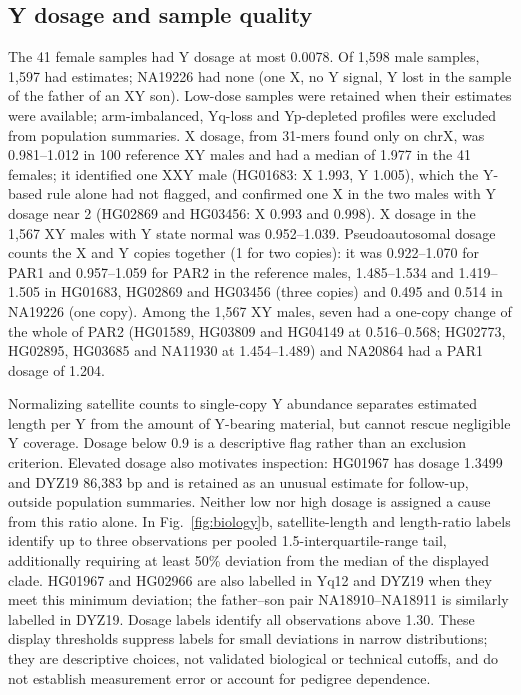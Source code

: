 \documentclass[pdflatex,sn-nature]{sn-jnl}
\begin{document}
\subsection{Y dosage and sample quality}\label{sec:res-dosage}
The 41 female samples had Y dosage at most 0.0078. Of 1,598 male samples, 1,597 had estimates; NA19226 had none (one X, no Y signal, Y lost in the sample of the father of an XY son). Low-dose samples were retained when their estimates were available; arm-imbalanced, Yq-loss and Yp-depleted profiles were excluded from population summaries. X dosage, from 31-mers found only on chrX, was 0.981--1.012 in 100 reference XY males and had a median of 1.977 in the 41 females; it identified one XXY male (HG01683: X 1.993, Y 1.005), which the Y-based rule alone had not flagged, and confirmed one X in the two males with Y dosage near 2 (HG02869 and HG03456: X 0.993 and 0.998). X dosage in the 1,567 XY males with Y state normal was 0.952--1.039. Pseudoautosomal dosage counts the X and Y copies together (1 for two copies): it was 0.922--1.070 for PAR1 and 0.957--1.059 for PAR2 in the reference males, 1.485--1.534 and 1.419--1.505 in HG01683, HG02869 and HG03456 (three copies) and 0.495 and 0.514 in NA19226 (one copy). Among the 1,567 XY males, seven had a one-copy change of the whole of PAR2 (HG01589, HG03809 and HG04149 at 0.516--0.568; HG02773, HG02895, HG03685 and NA11930 at 1.454--1.489) and NA20864 had a PAR1 dosage of 1.204.

Normalizing satellite counts to single-copy Y abundance separates estimated length per Y from the amount of Y-bearing material, but cannot rescue negligible Y coverage. Dosage below 0.9 is a descriptive flag rather than an exclusion criterion. Elevated dosage also motivates inspection: HG01967 has dosage 1.3499 and DYZ19 86,383 bp and is retained as an unusual estimate for follow-up, outside population summaries. Neither low nor high dosage is assigned a cause from this ratio alone. In Fig.~\ref{fig:biology}b, satellite-length and length-ratio labels identify up to three observations per pooled 1.5-interquartile-range tail, additionally requiring at least 50\% deviation from the median of the displayed clade. HG01967 and HG02966 are also labelled in Yq12 and DYZ19 when they meet this minimum deviation; the father--son pair NA18910--NA18911 is similarly labelled in DYZ19. Dosage labels identify all observations above 1.30. These display thresholds suppress labels for small deviations in narrow distributions; they are descriptive choices, not validated biological or technical cutoffs, and do not establish measurement error or account for pedigree dependence.
\end{document}
